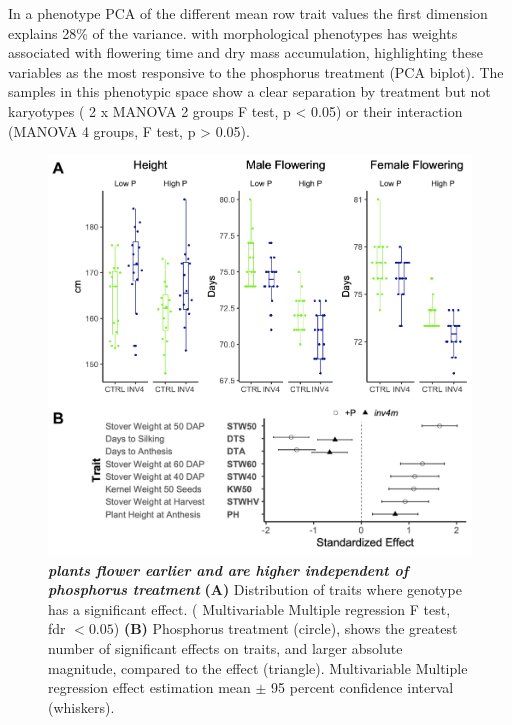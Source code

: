 In a phenotype PCA of the different mean row trait values the first dimension explains 28\% of the variance. with morphological phenotypes has weights associated with flowering time and dry mass accumulation, highlighting these variables as the most responsive to the phosphorus treatment (PCA biplot). 
The samples in this phenotypic space show a clear separation by treatment but not  \invfour karyotypes ( 2 x MANOVA 2 groups F test, p < 0.05) or their interaction (MANOVA 4 groups, F test, p > 0.05).


\begin{figure}[!ht]
\includegraphics[width=\linewidth]{Chapter-3/figs/effects.png}
\caption[\textit{\invfour} plants flower earlier and are higher independent of phosphorus treatment]{\textit{\textbf{\invfour plants flower earlier and are higher independent of phosphorus treatment}}
\textbf{(A)} Distribution of traits where \textit{\invfour} genotype has a significant effect. ( Multivariable Multiple regression F test, fdr $<0.05$)
\textbf{(B)} Phosphorus treatment (circle), shows the greatest number of significant effects on traits, and larger absolute magnitude, compared to the \textit{\invfour} effect (triangle). Multivariable Multiple regression effect estimation mean $\pm$ 95 percent confidence interval (whiskers).}
\label{fig::effects}
\end{figure}


